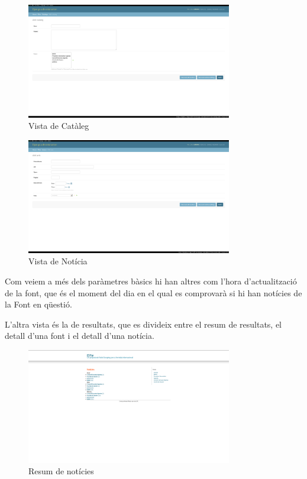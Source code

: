 \documentclass{article}
\begin{document}
\newpage

\begin{figure}[!ht]
    \centering
    \includegraphics[width=0.8\textwidth]{addcataleg.png}
    \caption{Vista de Catàleg}
\end{figure}

\begin{figure}[!ht]
    \centering
    \includegraphics[width=0.8\textwidth]{addavis.png}
    \caption{Vista de Notícia}
\end{figure}

\newpage

Com veiem a més dels paràmetres bàsics hi han altres com l'hora d'actualització de la font, que és el moment del dia en el qual es comprovarà si hi han notícies de la Font en qüestió.

L'altra vista és la de resultats, que es divideix entre el resum de resultats, el detall d'una font i el detall d'una notícia.


\begin{figure}[!ht]
    \centering
    \includegraphics[width=0.8\textwidth]{resum.png}
    \caption{Resum de notícies}
\end{figure}
\end{document}
